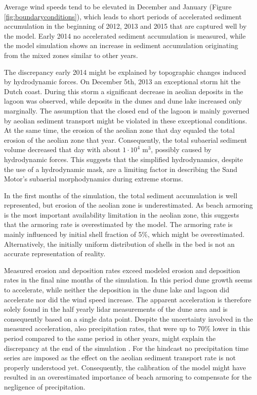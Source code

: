 Average wind speeds tend to be elevated in December and January
(Figure \ref{fig:boundaryconditions}), which leads to short periods of
accelerated sediment accumulation in the beginning of 2012, 2013 and
2015 that are captured well by the model. Early 2014 no accelerated
sediment accumulation is measured, while the model simulation shows an
increase in sediment accumulation originating from the mixed zones
similar to other years.

The discrepancy early 2014 might be explained by topographic changes
induced by hydrodynamic forces. On December 5th, 2013 an exceptional
storm hit the Dutch coast. During this storm a significant decrease in
aeolian deposits in the lagoon was observed, while deposits in the
dunes and dune lake increased only marginally. The assumption that the
closed end of the lagoon is mainly governed by aeolian sediment
transport might be violated in these exceptional conditions. At the
same time, the erosion of the aeolian zone that day equaled the total
erosion of the aeolian zone that year. Consequently, the total
subaerial sediment volume decreased that day with about $\mathrm{1
  \cdot 10^4}$ $\mathrm{m^3}$, possibly caused by hydrodynamic
forces. This suggests that the simplified hydrodynamics, despite the
use of a hydrodynamic mask, are a limiting factor in describing the
Sand Motor's subaerial morphodynamics during extreme storms.

In the first months of the simulation, the total sediment accumulation
is well represented, but erosion of the aeolian zone is
underestimated. As beach armoring is the most important availability
limitation in the aeolian zone, this suggests that the armoring rate
is overestimated by the model. The armoring rate is mainly influenced
by initial shell fraction of 5\%, which might be
overestimated. Alternatively, the initially uniform distribution of
shells in the bed is not an accurate representation of reality.

Measured erosion and deposition rates exceed modeled erosion and
deposition rates in the final nine months of the simulation. In this
period dune growth seems to accelerate, while neither the deposition
in the dune lake and lagoon did accelerate nor did the wind speed
increase. The apparent acceleration is therefore solely found in the
half yearly lidar measurements of the dune area \citep{Hoonhout2017a}
and is consequently based on a single data point. Despite the
uncertainty involved in the measured acceleration, also precipitation
rates, that were up to 70\% lower in this period compared to the same
period in other years, might explain the discrepancy at the end of the
simulation \citep{Jackson1998}. For the hindcast no precipitation time
series are imposed as the effect on the aeolian sediment transport
rate is not properly understood yet. Consequently, the calibration of
the model might have resulted in an overestimated importance of beach
armoring to compensate for the negligence of precipitation.


